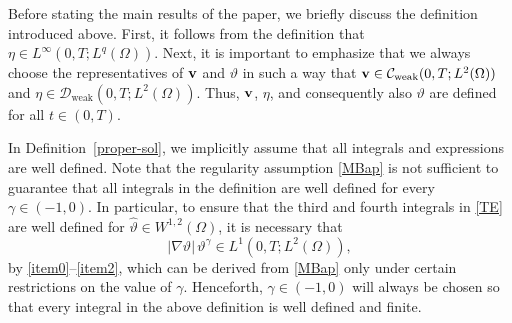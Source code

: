 \documentclass[11pt, a4paper, reqno]{amsart}
\numberwithin{equation}{section}
\newcommand{\thetah}{\hat\thet}
\newcommand{\vc}[1]{{\bf #1}}
\newcommand{\vv}{\vc{v}}
\newcommand{\thet}{\vartheta}
\renewcommand{\S}{\mathbf{S}}
\begin{document}
\bigskip 


Before stating the main results of the paper, we briefly discuss the definition introduced above. First, it follows from the definition that $\eta\in L^\infty(0,T; L^q(\Omega))$. Next, it is important to emphasize that we always choose the representatives of $\vv$ and $\thet$ in such a way that $\vv \in \mathcal{C}_{\textrm{weak}}(0,T; L^2(\Omega))$ and $\eta\in \mathcal{D}_{\textrm{weak}}(0,T; L^2(\Omega))$. Thus, $\vv$, $\eta$, and consequently also $\thet$ are defined for all $t\in (0,T)$.

In Definition~\ref{proper-sol}, we implicitly assume that all integrals and expressions are well defined. Note that the regularity assumption \eqref{MBap} is not sufficient to guarantee that all integrals in the definition are well defined for every $\gamma \in (-1,0)$. In particular, to ensure that the third and fourth integrals in \eqref{TE} are well defined for $\thetah \in W^{1,2}(\Omega)$, it is necessary that
\begin{equation}\label{ADD2}
|\nabla \thet| \, \thet^{\gamma} \in L^1(0,T; L^2(\Omega)),
\end{equation}
by \eqref{item0}--\eqref{item2}, which can be derived from \eqref{MBap} only under certain restrictions on the value of $\gamma$. Henceforth, $\gamma \in (-1,0)$ will always be chosen so that every integral in the above definition is well defined and finite.



\end{document}
